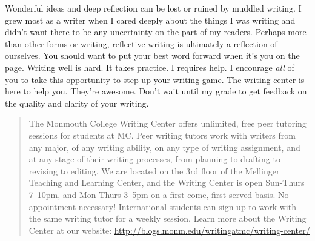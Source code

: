 \documentclass[]{tufte-handout}
\begin{document}
Wonderful ideas and deep reflection can be lost or ruined by muddled writing.  I grew most as a writer when I cared deeply about the things I was writing and didn't want there to be any uncertainty on the part of my readers. Perhaps more than other forms or writing, reflective writing is ultimately a reflection of ourselves. You should want to put your best word forward when it's you on the page. Writing well is hard. It takes practice. I requires help. I encourage \textit{all} of you to take this opportunity to step up your writing game. The writing center is here to help you. They're awesome. Don't wait until my grade to get feedback on the quality and clarity of your writing.
\begin{quote}
The Monmouth College Writing Center offers unlimited, free peer tutoring sessions for students at MC\@.  Peer writing tutors work with writers from any major, of any writing ability, on any type of writing assignment, and at any stage of their writing processes, from planning to drafting to revising to editing.  We are located on the 3rd floor of the Mellinger Teaching and Learning Center, and the Writing Center is open Sun-Thurs 7--10pm, and Mon-Thurs 3--5pm on a first-come, first-served basis.  No appointment necessary!  International students can sign up to work with the same writing tutor for a weekly session. Learn more about the Writing Center at our website: \url{http://blogs.monm.edu/writingatmc/writing-center/}
\end{quote}



\end{document}

